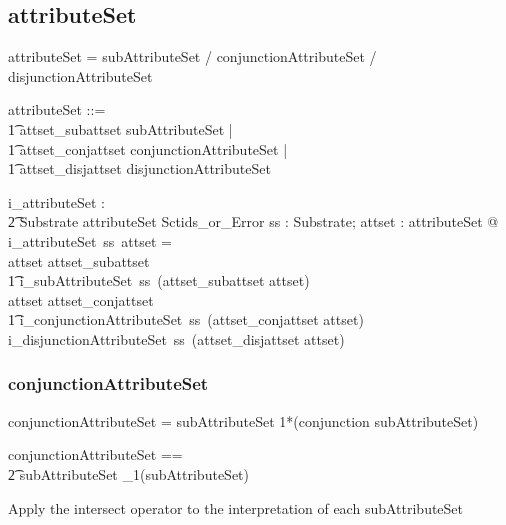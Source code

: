 \documentclass{article}
\def\bnf#1{{\scriptsize {{#1}} }}
\begin{document}
\subsection{attributeSet}

\begin{framed}
\noindent
\bnf{attributeSet = subAttributeSet / conjunctionAttributeSet / disjunctionAttributeSet}
\end{framed}

\begin{zed}
attributeSet ::= \\
\t1 attset\_subattset \ldata subAttributeSet \rdata | \\
\t1 attset\_conjattset \ldata conjunctionAttributeSet \rdata | \\
\t1 attset\_disjattset \ldata disjunctionAttributeSet \rdata
\end{zed}

\begin{gendef}
   i\_attributeSet : \\
\t2 Substrate \fun attributeSet \fun Sctids\_or\_Error
\where
   \forall ss : Substrate; attset : attributeSet @ \\
   i\_attributeSet~ss~attset = \\
   \IF attset \in \ran attset\_subattset \\
\t1 \THEN i\_subAttributeSet~ss~(attset\_subattset \inv attset) \\
   \ELSE \IF attset \in \ran attset\_conjattset \\
\t1 \THEN i\_conjunctionAttributeSet~ss~(attset\_conjattset \inv attset) \\
  \ELSE i\_disjunctionAttributeSet~ss~(attset\_disjattset \inv attset)
\end{gendef}

\subsubsection{conjunctionAttributeSet}
\begin{framed}
\noindent
\bnf{conjunctionAttributeSet = subAttributeSet 1*(conjunction subAttributeSet)}
\end{framed}

\begin{zed}
conjunctionAttributeSet == \\
\t2 subAttributeSet \cross \seq_1(subAttributeSet)
\end{zed}


Apply the intersect operator to the interpretation of each  subAttributeSet
\end{document}
